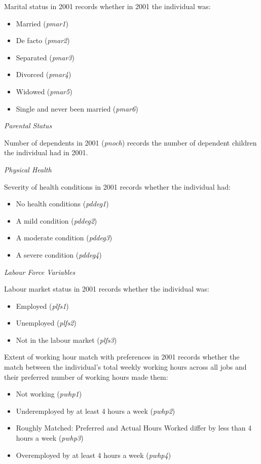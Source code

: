 \documentclass[12pt, a4paper]{article}
\begin{document}
Marital status in 2001 records whether in 2001 the individual was:
\begin{itemize}
  \item Married (\textit{p\textunderscore{}mar1})
  \item De facto (\textit{p\textunderscore{}mar2})
  \item Separated (\textit{p\textunderscore{}mar3})
  \item Divorced (\textit{p\textunderscore{}mar4})
  \item Widowed (\textit{p\textunderscore{}mar5})
  \item Single and never been married (\textit{p\textunderscore{}mar6})
\end{itemize}  
  
\emph{Parental Status}

Number of dependents in 2001 (\textit{p\textunderscore{}noch}) records the number of dependent children the individual had in 2001. 

\emph{Physical Health}

Severity of health conditions in 2001 records whether the individual had:
\begin{itemize}
  \item No health conditions (\textit{p\textunderscore{}ddeg1})
  \item A mild condition (\textit{p\textunderscore{}ddeg2})
  \item A moderate condition (\textit{p\textunderscore{}ddeg3})
  \item A severe condition (\textit{p\textunderscore{}ddeg4})
\end{itemize}  
  
\emph{Labour Force Variables}

Labour market status in 2001 records whether the individual was:
\begin{itemize}
  \item Employed (\textit{p\textunderscore{}lfs1})
  \item Unemployed (\textit{p\textunderscore{}lfs2})
  \item Not in the labour market (\textit{p\textunderscore{}lfs3})
\end{itemize} 

Extent of working hour match with preferences in 2001 records whether the match between the individual’s total weekly working hours across all jobs and their preferred number of working hours made them:
\begin{itemize}
  \item Not working (\textit{p\textunderscore{}whp1})
  \item Underemployed by at least 4 hours a week  (\textit{p\textunderscore{}whp2})
  \item Roughly Matched: Preferred and Actual Hours Worked differ by less than 4 hours a week (\textit{p\textunderscore{}whp3})
  \item Overemployed by at least 4 hours a week  (\textit{p\textunderscore{}whp4})
\end{itemize}  
  
\end{document}
